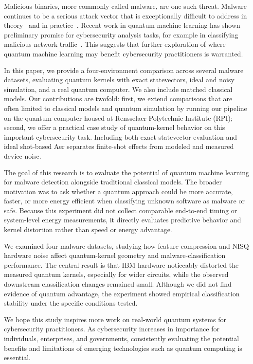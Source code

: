 \documentclass[letterpaper]{article} %
\begin{document}
Malicious binaries, more commonly called malware, are one such threat. Malware continues to be a serious attack vector that is exceptionally difficult to address in theory~\cite{cohen1987computer} and in practice~\cite{pachhala}. Recent work in quantum machine learning has shown preliminary promise for cybersecurity analysis tasks, for example in classifying malicious network traffic~\cite{cotrupi}. This suggests that further exploration of where quantum machine learning may benefit cybersecurity practitioners is warranted.

In this paper, we provide a four-environment comparison across several malware datasets, evaluating quantum kernels with exact statevectors, ideal and noisy simulation, and a real quantum computer. We also include matched classical models. Our contributions are twofold: first, we extend comparisons that are often limited to classical models and quantum simulation by running our pipeline on the quantum computer housed at Rensselaer Polytechnic Institute (RPI); second, we offer a practical case study of quantum-kernel behavior on this important cybersecurity task. Including both exact statevector evaluation and ideal shot-based Aer separates finite-shot effects from modeled and measured device noise.

The goal of this research is to evaluate the potential of quantum machine learning for malware detection alongside traditional classical models. The broader motivation was to ask whether a quantum approach could be more accurate, faster, or more energy efficient when classifying unknown software as malware or safe. Because this experiment did not collect comparable end-to-end timing or system-level energy measurements, it directly evaluates predictive behavior and kernel distortion rather than speed or energy advantage.

We examined four malware datasets, studying how feature compression and NISQ hardware noise affect quantum-kernel geometry and malware-classification performance. The central result is that IBM hardware noticeably distorted the measured quantum kernels, especially for wider circuits, while the observed downstream classification changes remained small. Although we did not find evidence of quantum advantage, the experiment showed empirical classification stability under the specific conditions tested.

We hope this study inspires more work on real-world quantum systems for cybersecurity practitioners. As cybersecurity increases in importance for individuals, enterprises, and governments, consistently evaluating the potential benefits and limitations of emerging technologies such as quantum computing is essential.
\end{document}
